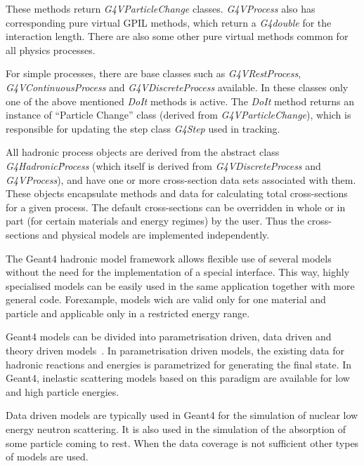 These methods return {\it G4VParticleChange} classes. 
{\it G4VProcess} also has corresponding pure virtual GPIL
methods, which return a {\it G4double} for the interaction length. There are
also some other pure virtual methods common for all physics processes.

For simple processes, there are base classes such as {\it
  G4VRestProcess}, {\it G4VContinuous\-Process} and {\it G4VDiscrete\-Process}
available. In these classes only one of the above mentioned {\it DoIt}
methods is active. The {\it DoIt} method returns an instance of
``Particle Change'' class (derived from {\it G4VParticleChange}),
which is responsible for updating the step class {\it G4Step} used in
tracking.

All hadronic process objects are derived from the abstract class {\it
  G4Hadronic\.Process} (which itself is derived from {\it
  G4VDis\-crete\-Process} and {\it G4VProcess}), and have one or more
cross-section data sets associated with them. These objects
encapsulate methods and data for calculating total cross-sections for
a given process. The default cross-sections can be overridden in whole
or in part (for certain materials and energy regimes) by the user.
Thus the cross-sections and physical models are implemented independently.

The Geant4 hadronic model framework allows flexible use of several models
without the need for the implementation of a special interface. 
This way, highly specialised models can be easily used in the same
application together with more general code. Forexample, models wich
are valid only for one material and particle and applicable only in a restricted energy range.

Geant4 models can be divided into parametrisation driven, data driven and
theory driven models~\cite{privAmelin, wellisch99}.
In parametrisation driven models, the existing data for hadronic
reactions and energies is parametrized for generating the final
state. In Geant4, inelastic scattering models based on this paradigm are
available for low and high particle energies.

Data driven models are typically used in Geant4 for the simulation of
nuclear low energy neutron scattering.  It is also used in the
simulation of the absorption of some particle coming to rest. When the data
coverage is not sufficient other types of models are used.

